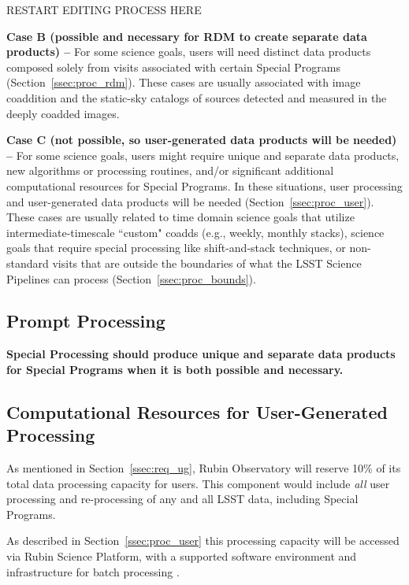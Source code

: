 RESTART EDITING PROCESS HERE



\textbf{Case B (possible and necessary for RDM to create separate data products) -- }
For some science goals, users will need distinct data products composed solely from visits associated with certain Special Programs (Section~\ref{ssec:proc_rdm}).
These cases are usually associated with image coaddition and the static-sky catalogs 
of sources detected and measured in the deeply coadded images. 

\textbf{Case C (not possible, so user-generated data products will be needed) -- }
For some science goals, users might require unique and separate data products, 
new algorithms or processing routines, and/or significant additional 
computational resources for Special Programs.
In these situations, user processing and user-generated data products will be 
needed (Section~\ref{ssec:proc_user}).
These cases are usually related to time domain science goals that utilize 
intermediate-timescale ``custom" coadds (e.g., weekly, monthly stacks), 
science goals that require special processing like shift-and-stack techniques, 
or non-standard visits that are outside the boundaries of what the LSST
Science Pipelines can process (Section~\ref{ssec:proc_bounds}).


\subsection{Prompt Processing}\label{ssec:sci_pproc}

\textbf{Special Processing should produce unique and separate data products
for Special Programs when it is both possible and necessary.}



\subsection{Computational Resources for User-Generated Processing}\label{ssec:sci_comp}

As mentioned in Section~\ref{ssec:req_ug}, Rubin Observatory will reserve 10\% of its 
total data processing capacity for users.
This component would include {\it all} user processing and re-processing of any and 
all LSST data, including Special Programs. 

As described in Section~\ref{ssec:proc_user} this processing capacity will be 
accessed via Rubin Science Platform, with a supported software environment and 
infrastructure for batch processing .

